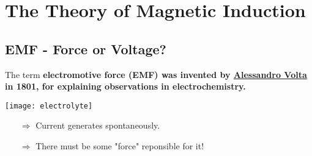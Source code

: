 \documentclass[class=article, crop=false, 12pt]{standalone}
\begin{document}
\begin{itemize}
\end{itemize}






\linesep
\section{The Theory of Magnetic Induction}


\subsection{EMF - Force or Voltage?}

The term \bf{electromotive force} (EMF) was invented by 
\href{https://en.wikipedia.org/wiki/Alessandro_Volta}{Alessandro Volta} in 1801,
for explaining observations in electrochemistry.

\begin{center}
    \begin{minipage}{0.2\linewidth}
        \centering
        \texttt{[image: electrolyte]}
    \end{minipage}
    \hspace{0.01\textwidth}
        \begin{minipage}{0.55\linewidth}
            \begin{itemize}
            \item[$\Rightarrow$] Current generates spontaneously.
            \item[$\Rightarrow$] There must be some "force" reponsible for it! 
        \end{itemize}
    \end{minipage}
\end{center}
\end{document}
